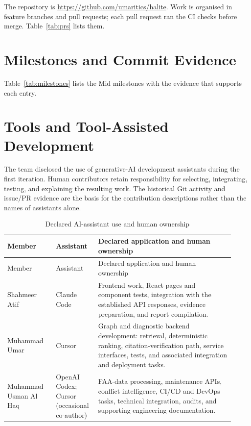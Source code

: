The repository is \url{https://github.com/umaritics/halite}. Work is organised in feature branches and pull requests; each pull request ran the CI checks before merge. Table~\ref{tab:prs} lists them.



\section{Milestones and Commit Evidence}

Table~\ref{tab:milestones} lists the Mid milestones with the evidence that supports each entry.



\section{Tools and Tool-Assisted Development}

The team disclosed the use of generative-AI development assistants during the first iteration. Human contributors retain responsibility for selecting, integrating, testing, and explaining the resulting work. The historical Git activity and issue/PR evidence are the basis for the contribution descriptions rather than the names of assistants alone.

\begin{longtable}{@{}p{0.20\linewidth}p{0.16\linewidth}p{0.56\linewidth}@{}}
\caption{Declared AI-assistant use and human ownership}\label{tab:ai-tools}\\
\toprule
Member & Assistant & Declared application and human ownership \\
\midrule
\endfirsthead
\toprule
Member & Assistant & Declared application and human ownership \\
\midrule
\endhead
Shahmeer Atif & Claude Code & Frontend work, React pages and component tests, integration with the established API responses, evidence preparation, and report compilation. \\
Muhammad Umar & Cursor & Graph and diagnostic backend development: retrieval, deterministic ranking, citation-verification path, service interfaces, tests, and associated integration and deployment tasks. \\
Muhammad Usman Al Haq & OpenAI Codex; Cursor (occasional co-author) & FAA-data processing, maintenance APIs, conflict intelligence, CI/CD and DevOps tasks, technical integration, audits, and supporting engineering documentation. \\
\bottomrule
\end{longtable}

